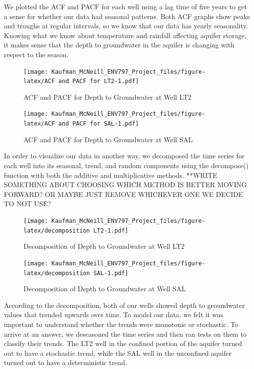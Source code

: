 \documentclass[
]{article}
\begin{document}
We plotted the ACF and PACF for each well using a lag time of five years
to get a sense for whether our data had seasonal patterns. Both ACF
graphs show peaks and troughs at regular intervals, so we know that our
data has yearly seasonality. Knowing what we know about temperature and
rainfall affecting aquifer storage, it makes sense that the depth to
groundwater in the aquifer is changing with respect to the season.

\begin{figure}
\centering
\texttt{[image: Kaufman\_McNeill\_ENV797\_Project\_files/figure-latex/ACF and PACF for LT2-1.pdf]}
\caption{ACF and PACF for Depth to Groundwater at Well LT2}
\end{figure}

\begin{figure}
\centering
\texttt{[image: Kaufman\_McNeill\_ENV797\_Project\_files/figure-latex/ACF and PACF for SAL-1.pdf]}
\caption{ACF and PACF for Depth to Groundwater at Well SAL}
\end{figure}

In order to visualize our data in another way, we decomposed the time
series for each well into its seasonal, trend, and random components
using the decompose() function with both the additive and multiplicative
methods. **WRITE SOMETHING ABOUT CHOOSING WHICH METHOD IS BETTER MOVING
FORWARD? OR MAYBE JUST REMOVE WHICHEVER ONE WE DECIDE TO NOT USE?

\begin{figure}
\centering
\texttt{[image: Kaufman\_McNeill\_ENV797\_Project\_files/figure-latex/decomposition LT2-1.pdf]}
\caption{Decomposition of Depth to Groundwater at Well LT2}
\end{figure}

\begin{figure}
\centering
\texttt{[image: Kaufman\_McNeill\_ENV797\_Project\_files/figure-latex/decomposition SAL-1.pdf]}
\caption{Decomposition of Depth to Groundwater at Well SAL}
\end{figure}

According to the decomposition, both of our wells showed depth to
groundwater values that trended upwards over time. To model our data, we
felt it was important to understand whether the trends were monotonic or
stochastic. To arrive at an answer, we deseasoned the time series and
then ran tests on them to classify their trends. The LT2 well in the
confined portion of the aquifer turned out to have a stochastic trend,
while the SAL well in the unconfined aquifer turned out to have a
deterministic trend.
\end{document}
